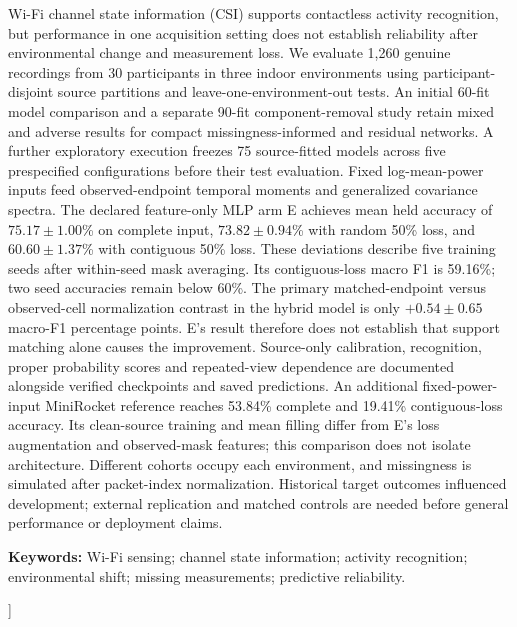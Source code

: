 \documentclass[a4paper,11pt,fleqn]{mira-author}
\begin{document}
{\begin{minipage}{\textwidth}
{Wi-Fi channel state information (CSI) supports contactless activity recognition, but performance in one acquisition setting does not establish reliability after environmental change and measurement loss. We evaluate 1,260 genuine recordings from 30 participants in three indoor environments using participant-disjoint source partitions and leave-one-environment-out tests. An initial 60-fit model comparison and a separate 90-fit component-removal study retain mixed and adverse results for compact missingness-informed and residual networks. A further exploratory execution freezes 75 source-fitted models across five prespecified configurations before their test evaluation. Fixed log-mean-power inputs feed observed-endpoint temporal moments and generalized covariance spectra. The declared feature-only MLP arm E achieves mean held accuracy of $75.17\pm1.00$\% on complete input, $73.82\pm0.94$\% with random 50\% loss, and $60.60\pm1.37$\% with contiguous 50\% loss. These deviations describe five training seeds after within-seed mask averaging. Its contiguous-loss macro F1 is 59.16\%; two seed accuracies remain below 60\%. The primary matched-endpoint versus observed-cell normalization contrast in the hybrid model is only $+0.54\pm0.65$ macro-F1 percentage points. E's result therefore does not establish that support matching alone causes the improvement. Source-only calibration, recognition, proper probability scores and repeated-view dependence are documented alongside verified checkpoints and saved predictions. An additional fixed-power-input MiniRocket reference reaches 53.84\% complete and 19.41\% contiguous-loss accuracy. Its clean-source training and mean filling differ from E's loss augmentation and observed-mask features; this comparison does not isolate architecture. Different cohorts occupy each environment, and missingness is simulated after packet-index normalization. Historical target outcomes influenced development; external replication and matched controls are needed before general performance or deployment claims.\par}
\vspace{2mm}
{\sffamily\fontsize{8.7}{11}\selectfont\textbf{Keywords:} Wi-Fi sensing; channel state information; activity recognition; environmental shift; missing measurements; predictive reliability.\par}
\vspace{3mm}
\end{minipage}
}]
\fontsize{10.5}{13}\selectfont
\end{document}
